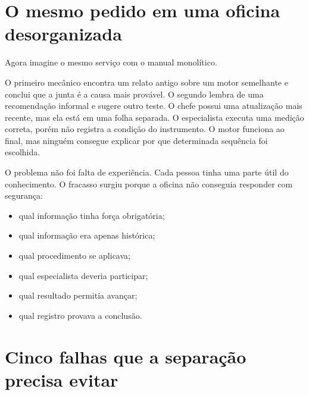 \documentclass[
  10pt,
  a4paper,
  oneside]{book}
\providecommand{\tightlist}{%
  \setlength{\itemsep}{0pt}\setlength{\parskip}{0pt}}
\begin{document}
\hypertarget{o-mesmo-pedido-em-uma-oficina-desorganizada}{%
\section{O mesmo pedido em uma oficina
desorganizada}\label{o-mesmo-pedido-em-uma-oficina-desorganizada}}

Agora imagine o mesmo serviço com o manual monolítico.

O primeiro mecânico encontra um relato antigo sobre um motor semelhante
e conclui que a junta é a causa mais provável. O segundo lembra de uma
recomendação informal e sugere outro teste. O chefe possui uma
atualização mais recente, mas ela está em uma folha separada. O
especialista executa uma medição correta, porém não registra a condição
do instrumento. O motor funciona ao final, mas ninguém consegue explicar
por que determinada sequência foi escolhida.

O problema não foi falta de experiência. Cada pessoa tinha uma parte
útil do conhecimento. O fracasso surgiu porque a oficina não conseguia
responder com segurança:

\begin{itemize}
\tightlist
\item
  qual informação tinha força obrigatória;
\item
  qual informação era apenas histórica;
\item
  qual procedimento se aplicava;
\item
  qual especialista deveria participar;
\item
  qual resultado permitia avançar;
\item
  qual registro provava a conclusão.
\end{itemize}

\hypertarget{cinco-falhas-que-a-separauxe7uxe3o-precisa-evitar}{%
\section{Cinco falhas que a separação precisa
evitar}\label{cinco-falhas-que-a-separauxe7uxe3o-precisa-evitar}}
\end{document}
